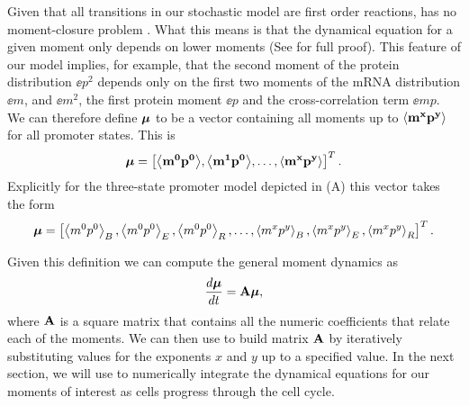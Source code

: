 Given that all transitions in our stochastic model are first order reactions,
 has no moment-closure problem \cite{Voliotis2014a}. What this
means is that the dynamical equation for a given moment only depends on lower
moments (See  for full proof). This feature of our model
implies, for example, that the second moment of the protein distribution
$\ee{p^2}$ depends only on the first two moments of the mRNA distribution
$\ee{m}$, and $\ee{m^2}$, the first protein moment $\ee{p}$  and the
cross-correlation term $\ee{mp}$. We can therefore define $\boldsymbol{\mu}$ to be a
vector containing all moments up to $\mathbf{\left\langle m^x p^y \right\rangle}$ for all promoter states.
This is
\begin{equation}
\boldsymbol{\mu} = \left[ \mathbf{\left\langle m^0 p^0 \right\rangle},
							\mathbf{\left\langle m^1 p^0 \right\rangle},
							\ldots, \mathbf{\left\langle m^x p^y \right\rangle} \right]^T.
\end{equation}
Explicitly for the three-state promoter model depicted in
(A) this vector takes the form
\begin{equation}
	\boldsymbol{\mu} = \left[ \left\langle m^0 p^0 \right\rangle_B, \left\langle m^0 p^0 \right\rangle_E, \left\langle m^0 p^0 \right\rangle_R,
	\ldots, \left\langle m^x p^y \right\rangle_B, \left\langle m^x p^y \right\rangle_E, \left\langle m^x p^y \right\rangle_R \right]^T.
\end{equation}

Given this definition we can compute the general moment dynamics as
\begin{equation}
{d{\boldsymbol{\mu}} \over dt} = \mathbf{A} \boldsymbol{\mu},
\label{eq_mom_dynamics}
\end{equation}
where $\mathbf{A}$ is a square matrix that contains all the numeric coefficients
that relate each of the moments. We can then use  to build
matrix $\mathbf{A}$ by iteratively substituting values for the exponents $x$ and $y$
up to a specified value. In the next section, we will use 
to numerically integrate the dynamical equations for our moments of interest as
cells progress through the cell cycle.
